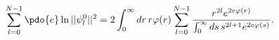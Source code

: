 \begin{equation}
\label{Eq_0501}
\sum^{N-1}_{l=0} \pdo{e}\ln||\psi^0_l||^2
  = 2 \int^{\infty}_0 dr \, r \varphi(r)
    \sum^{N-1}_{l=0}
    \frac{r^{2l} e^{2e\varphi(r)}}
         {\int^{\infty}_0 ds \, s^{2l+1} e^{2e\varphi(s)}}.
\end{equation}

